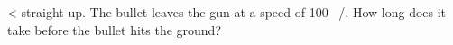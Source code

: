 <%
straight up.  The bullet leaves the gun at a speed of 100
\ \munit/\sunit.  How long does it take before the bullet hits the ground?
